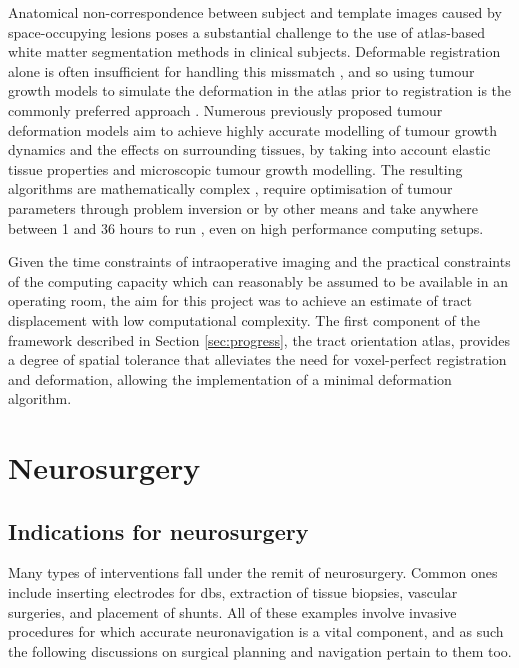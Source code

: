Anatomical non-correspondence between subject and template images caused by space-occupying lesions poses a substantial challenge to the use of atlas-based white matter segmentation methods in clinical subjects.
Deformable registration alone is often insufficient for handling this missmatch \autocite{Elazab2018, Visser2020}, and so using tumour growth models to simulate the deformation in the atlas prior to registration is the commonly preferred approach \autocite{Cabezas2011, Mang2020}.
Numerous previously proposed tumour deformation models aim to achieve highly accurate modelling of tumour growth dynamics and the effects on surrounding tissues, by taking into account elastic tissue properties and microscopic tumour growth modelling.
The resulting algorithms are mathematically complex \autocite{Elazab2018}, require optimisation of tumour parameters through problem inversion or by other means \autocite{Mohamed2006, Zacharaki2009, Mang2020} and take anywhere between 1 and 36 hours to run \autocite{Zacharaki2009,Bauer2012, Bauer2013,Mang2012}, even on high performance computing setups.

Given the time constraints of intraoperative imaging and the practical constraints of the computing capacity which can reasonably be assumed to be available in an operating room, the aim for this project was to achieve an estimate of tract displacement with low computational complexity.
The first component of the framework described in Section \ref{sec:progress}, the tract orientation atlas, provides a degree of spatial tolerance that alleviates the need for voxel-perfect registration and deformation, allowing the implementation of a minimal deformation algorithm.

\section{Neurosurgery}

\subsection{Indications for neurosurgery}


Many types of interventions fall under the remit of neurosurgery.
Common ones include inserting electrodes for \gls{dbs}, extraction of tissue biopsies, vascular surgeries, and placement of shunts.
All of these examples involve invasive procedures for which accurate neuronavigation is a vital component, and as such the following discussions on surgical planning and navigation pertain to them too.

